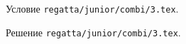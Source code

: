 Условие \texttt{regatta/junior/combi/3.tex}.

\solution Решение \texttt{regatta/junior/combi/3.tex}.
